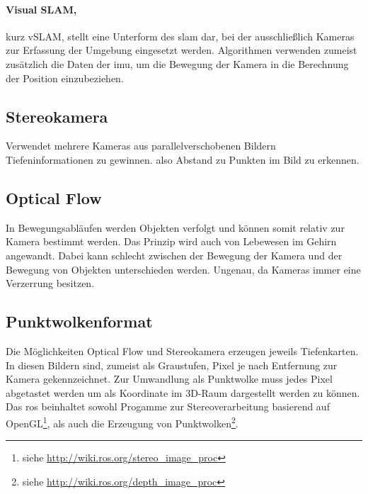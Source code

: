 \paragraph*{Visual SLAM,}kurz vSLAM, stellt eine Unterform des \gls{slam} dar, bei der ausschließlich Kameras zur Erfassung der Umgebung eingesetzt werden. Algorithmen verwenden zumeist zusätzlich die Daten der \acrshort{imu}, um die Bewegung der Kamera in die Berechnung der Position einzubeziehen.

\subsection{Stereokamera}\label{chap:stereovision}
Verwendet mehrere Kameras aus parallelverschobenen Bildern Tiefeninformationen zu gewinnen. also Abstand zu Punkten im Bild zu erkennen.
\subsection{Optical Flow}
In Bewegungsabläufen werden Objekten verfolgt und können somit relativ zur Kamera bestimmt werden. Das Prinzip wird auch von Lebewesen im Gehirn angewandt. Dabei kann schlecht zwischen der Bewegung der Kamera und der Bewegung von Objekten unterschieden werden. Ungenau, da Kameras immer eine Verzerrung besitzen. 

\subsection{Punktwolkenformat}
Die Möglichkeiten Optical Flow und Stereokamera erzeugen jeweils Tiefenkarten. In diesen Bildern sind, zumeist als Graustufen, Pixel je nach Entfernung zur Kamera gekennzeichnet. Zur Umwandlung als Punktwolke muss jedes Pixel abgetastet werden um als Koordinate im 3D-Raum dargestellt werden zu können. Das \acrshort{ros} beinhaltet sowohl Progamme zur Stereoverarbeitung basierend auf OpenGL\footnote{siehe \url{http://wiki.ros.org/stereo_image_proc}}, als auch die Erzeugung von Punktwolken\footnote{siehe \url{http://wiki.ros.org/depth_image_proc}}.
